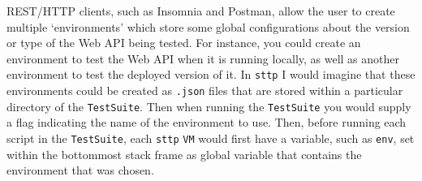 REST/HTTP clients, such as Insomnia and Postman, allow the user to create multiple `environments' which store some global configurations about the version or type of the Web API being tested. For instance, you could create an environment to test the Web API when it is running locally, as well as another environment to test the deployed version of it. In \verb|sttp| I would imagine that these environments could be created as \verb|.json| files that are stored within a particular directory of the \verb|TestSuite|. Then when running the \verb|TestSuite| you would supply a flag indicating the name of the environment to use. Then, before running each script in the \verb|TestSuite|, each \verb|sttp| \verb|VM| would first have a variable, such as \verb|env|, set within the bottommost stack frame as global variable that contains the environment that was chosen.

